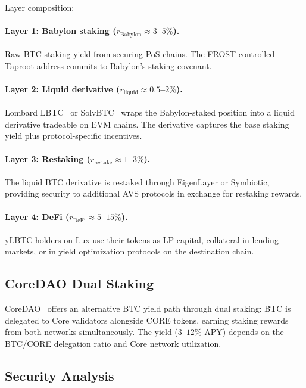 \noindent
Layer composition:

\paragraph{Layer 1: Babylon staking ($r_{\text{Babylon}} \approx 3$--$5\%$).} Raw BTC staking yield from securing PoS chains. The FROST-controlled Taproot address commits to Babylon's staking covenant.

\paragraph{Layer 2: Liquid derivative ($r_{\text{liquid}} \approx 0.5$--$2\%$).} Lombard LBTC~\cite{lombard2024} or SolvBTC~\cite{solvbtc} wraps the Babylon-staked position into a liquid derivative tradeable on EVM chains. The derivative captures the base staking yield plus protocol-specific incentives.

\paragraph{Layer 3: Restaking ($r_{\text{restake}} \approx 1$--$3\%$).} The liquid BTC derivative is restaked through EigenLayer or Symbiotic, providing security to additional AVS protocols in exchange for restaking rewards.

\paragraph{Layer 4: DeFi ($r_{\text{DeFi}} \approx 5$--$15\%$).} yLBTC holders on Lux use their tokens as LP capital, collateral in lending markets, or in yield optimization protocols on the destination chain.

\subsection{CoreDAO Dual Staking}

CoreDAO~\cite{coredao} offers an alternative BTC yield path through dual staking: BTC is delegated to Core validators alongside CORE tokens, earning staking rewards from both networks simultaneously. The yield ($3$--$12\%$ APY) depends on the BTC/CORE delegation ratio and Core network utilization.

\subsection{Security Analysis}

